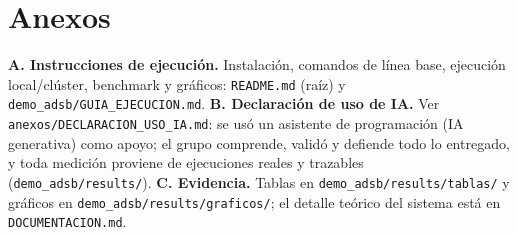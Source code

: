 \documentclass[letterpaper,11pt]{article}
\begin{document}
\section*{Anexos}
\textbf{A. Instrucciones de ejecución.} Instalación, comandos de línea base, ejecución local/clúster,
benchmark y gráficos: \texttt{README.md} (raíz) y \texttt{demo\_adsb/GUIA\_EJECUCION.md}.
\textbf{B. Declaración de uso de IA.} Ver \texttt{anexos/DECLARACION\_USO\_IA.md}: se usó un asistente de
programación (IA generativa) como apoyo; el grupo comprende, validó y defiende todo lo entregado, y toda
medición proviene de ejecuciones reales y trazables (\texttt{demo\_adsb/results/}).
\textbf{C. Evidencia.} Tablas en \texttt{demo\_adsb/results/tablas/} y gráficos en
\texttt{demo\_adsb/results/graficos/}; el detalle teórico del sistema está en \texttt{DOCUMENTACION.md}.
\end{document}
